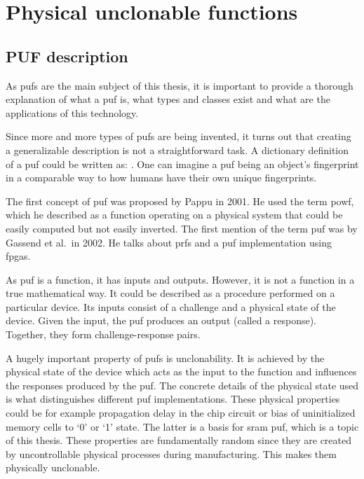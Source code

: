 \chapter{Physical unclonable functions}\label{sec:puf}

\section{PUF description}

As \glspl{puf} are the main subject of this thesis, it is important to provide a thorough explanation of what a \gls{puf} is, what types and classes exist and what are
the applications of this technology.

Since more and more types of \glspl{puf} are being invented, it turns out that creating a generalizable description is not a straightforward task. A dictionary definition of a \gls{puf} could be written as: . One can imagine a \gls{puf} being an object's fingerprint in a comparable way to how humans have their own unique fingerprints.~\cite{Maes2013}

The first concept of \gls{puf} was proposed by Pappu in 2001. He used the term \gls{powf}, which he described as a function operating on a physical system that could be easily computed but not easily inverted.\cite{Pappu2001} The first mention of the term \gls{puf} was by Gassend et al.\ in 2002. He talks about \glspl{prf} and a \gls{puf} implementation using \glspl{fpga}.~\cite{Gassend2002}

As \gls{puf} is a function, it has inputs and outputs. However, it is not a function in a true mathematical way. It could be described as a procedure performed on a particular device. Its inputs consist of a challenge and a physical state of the device. Given the input, the \gls{puf} produces an output (called a response). Together, they form challenge-response pairs.   

A hugely important property of \glspl{puf} is unclonability. It is achieved by the physical state of the device which acts as the input to the function and influences the responses produced by the \gls{puf}. The concrete details of the physical state used is what distinguishes different \gls{puf} implementations. These physical properties could be for example propagation delay in the chip circuit or bias of uninitialized memory cells to `0' or `1' state. The latter is a basis for \gls{sram} \gls{puf}, which is a topic of this thesis. These properties are fundamentally random since they are created by uncontrollable physical processes during manufacturing. This makes them physically unclonable.

